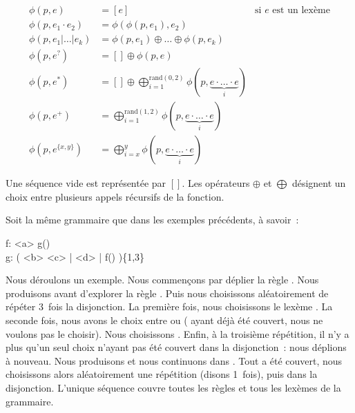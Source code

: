 \begin{align*}
%
\phi(p, e) & =
    [e]
    &
    \text{si $e$ est un lexème}
    \\
%
\phi(p, e_1 \cdot e_2) & =
    \phi(\phi(p, e_1), e_2)
    \\
%
\phi(p, e_1 \vert \dotso \vert e_k) & =
    \phi(p, e_1) \oplus \dotso \oplus \phi(p, e_k)
    \\
%
\phi(p, e^?) & =
    [] \oplus \phi(p, e)
    \\
%
\phi(p, e^*) & =
    [] \oplus \bigoplus_{i = 1}^{\mathrm{rand}(0, 2)}
    \phi(p, \underbrace{e \cdot \dotso \cdot e}_i)
    \\
%
\phi(p, e^+) & =
    \bigoplus_{i = 1}^{\mathrm{rand}(1, 2)}
    \phi(p, \underbrace{e \cdot \dotso \cdot e}_i)
    \\
%
\phi(p, e^{\{x, y\}}) & =
    \bigoplus_{i = x}^y \phi(p, \underbrace{e \cdot \dotso \cdot e}_i)
%
\end{align*}

Une séquence vide est représentée par $[]$. Les opérateurs $\oplus$ et
$\bigoplus$ désignent un choix entre plusieurs appels récursifs de la fonction.

\begin{example}
\label{example:data:coverage_based_generation}

Soit la même grammaire que dans les exemples précédents, à savoir~:

\begin{pre}
f: <a> g() \\
g: ( <b> <c> | <d> | f() )\{1,3\}
\end{pre}

Nous déroulons un exemple. Nous commençons par déplier la règle . Nous
produisons  avant d'explorer la règle . Puis nous choisissons
aléatoirement de répéter 3~fois la disjonction. La première fois, nous
choisissons le lexème . La seconde fois, nous avons le choix entre
 ou  ( ayant déjà été couvert, nous ne voulons
pas le choisir). Nous choisissons . Enfin, à la troisième
répétition, il n'y a plus qu'un seul choix n'ayant pas été couvert dans la
disjonction~: nous déplions  à nouveau. Nous produisons  et
nous continuons dans . Tout a été couvert, nous choisissons alors
aléatoirement une répétition (disons 1~fois), puis  dans la
disjonction. L'unique séquence  couvre toutes les
règles et tous les lexèmes de la grammaire.

\end{example}


